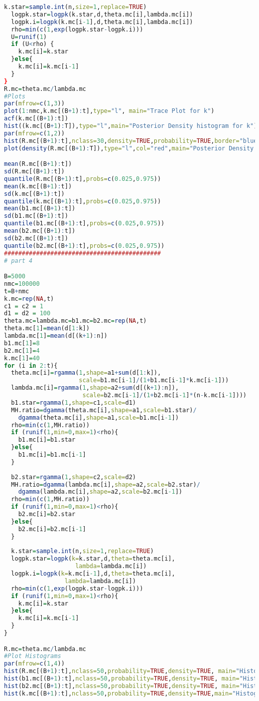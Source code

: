 \documentclass[10pt,a4paper]{article}
\begin{document}
\begin{lstlisting}[language=R]
  k.star=sample.int(n,size=1,replace=TRUE)
  logpk.star=logpk(k.star,d,theta.mc[i],lambda.mc[i])
  logpk.i=logpk(k.mc[i-1],d,theta.mc[i],lambda.mc[i])
  rho=min(c(1,exp(logpk.star-logpk.i)))
  U=runif(1)
  if (U<rho) {
    k.mc[i]=k.star
  }else{
    k.mc[i]=k.mc[i-1]
  }
}
R.mc=theta.mc/lambda.mc
#Plots
par(mfrow=c(1,3))
plot(1:nmc,k.mc[(B+1):t],type="l", main="Trace Plot for k")
acf(k.mc[(B+1):t])
hist((k.mc[(B+1):T]),type="l",main="Posterior Density histogram for k")
par(mfrow=c(1,2))
hist(R.mc[(B+1):t],nclass=30,density=TRUE,probability=TRUE,border="blue",xlab="k.mc",main="Histogram for R")
plot(density(R.mc[(B+1):T]),type="l",col="red",main="Posterior Density plot for R")

mean(R.mc[(B+1):t])
sd(R.mc[(B+1):t])
quantile(R.mc[(B+1):t],probs=c(0.025,0.975))
mean(k.mc[(B+1):t])
sd(k.mc[(B+1):t])
quantile(k.mc[(B+1):t],probs=c(0.025,0.975))
mean(b1.mc[(B+1):t])
sd(b1.mc[(B+1):t])
quantile(b1.mc[(B+1):t],probs=c(0.025,0.975))
mean(b2.mc[(B+1):t])
sd(b2.mc[(B+1):t])
quantile(b2.mc[(B+1):t],probs=c(0.025,0.975))
############################################
# part 4

B=5000
nmc=100000
t=B+nmc
k.mc=rep(NA,t)
c1 = c2 = 1
d1 = d2 = 100
theta.mc=lambda.mc=b1.mc=b2.mc=rep(NA,t)
theta.mc[1]=mean(d[1:k])
lambda.mc[1]=mean(d[(k+1):n])
b1.mc[1]=8
b2.mc[1]=4
k.mc[1]=40
for (i in 2:t){
  theta.mc[i]=rgamma(1,shape=a1+sum(d[1:k]),
                     scale=b1.mc[i-1]/(1+b1.mc[i-1]*k.mc[i-1]))
  lambda.mc[i]=rgamma(1,shape=a2+sum(d[(k+1):n]),
                      scale=b2.mc[i-1]/(1+b2.mc[i-1]*(n-k.mc[i-1])))
  b1.star=rgamma(1,shape=c1,scale=d1)
  MH.ratio=dgamma(theta.mc[i],shape=a1,scale=b1.star)/
    dgamma(theta.mc[i],shape=a1,scale=b1.mc[i-1])
  rho=min(c(1,MH.ratio))
  if (runif(1,min=0,max=1)<rho){
    b1.mc[i]=b1.star
  }else{
    b1.mc[i]=b1.mc[i-1]
  }
  
  b2.star=rgamma(1,shape=c2,scale=d2)
  MH.ratio=dgamma(lambda.mc[i],shape=a2,scale=b2.star)/
    dgamma(lambda.mc[i],shape=a2,scale=b2.mc[i-1])
  rho=min(c(1,MH.ratio))
  if (runif(1,min=0,max=1)<rho){
    b2.mc[i]=b2.star
  }else{
    b2.mc[i]=b2.mc[i-1]
  }
  
  k.star=sample.int(n,size=1,replace=TRUE)
  logpk.star=logpk(k=k.star,d,theta=theta.mc[i],
                    lambda=lambda.mc[i])
  logpk.i=logpk(k=k.mc[i-1],d,theta=theta.mc[i],
                 lambda=lambda.mc[i])
  rho=min(c(1,exp(logpk.star-logpk.i)))
  if (runif(1,min=0,max=1)<rho){
    k.mc[i]=k.star
  }else{
    k.mc[i]=k.mc[i-1]
  }
}

R.mc=theta.mc/lambda.mc
#Plot Histograms
par(mfrow=c(1,4))
hist(R.mc[(B+1):t],nclass=50,probability=TRUE,density=TRUE, main="Histogram for R")
hist(b1.mc[(B+1):t],nclass=50,probability=TRUE,density=TRUE, main="Histogram for b1")
hist(b2.mc[(B+1):t],nclass=50,probability=TRUE,density=TRUE, main="Histogram for b2")
hist(k.mc[(B+1):t],nclass=50,probability=TRUE,density=TRUE,main="Histogram for k")


\end{lstlisting}
\end{document}
